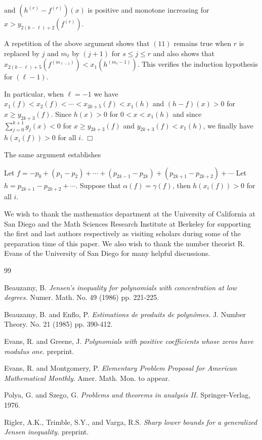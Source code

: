 and $(h^{(r)} - f^{(r)}) {(x)}$ is positive and monotone increasing
for $x > y_{2(k-\ell)+2} (f^{(r)})$.


A repetition of the above argument shows that $(11)$ remains true
when $r$ is replaced by $j$ and $m_\ell$ by $(j+1)$ for $s \leq j
\leq r$ and also shows that $x_{2(k-\ell)+5} (f^{(m_{\ell-1})}) < x_1
(h^{(m_\ell-1)})$.  This verifies the induction hypothesis for $(\ell
-1)$.

In particular, when $\ell = -1$ we have $x_1 (f) < x_2 (f) < \cdots <
x_{2k+5} (f) < x_1 (h)$ and $(h-f) (x) > 0$ for $x \geq y_{2k+3}
(f)$.  Since $h(x) > 0$ for $0 < x < x_1 (h)$ and since
$\sum^{k+1}_{j=0} g_j (x) <0$ for $x \geq y_{2k+3} (f)$ and $y_{2k+3}
(f) < x_1 (h)$, we finally have $h(x_i (f)) > 0$ for all $i$.
$\Box$\vspace{12pt}

The same argument establishes

\begin{lemma} Let $f = -p_0 + (p_1 - p_2) + \cdots + (p_{2k-1} -
p_{2k}) + (p_{2k+1} - p_{2k+2}) + \cdots$  Let $h = p_{2k+1} -
p_{2k+2} + \cdots$.  Suppose that $\alpha (f) = \gamma (f)$, then
$h(x_i (f)) > 0$ for all $i$.
\end{lemma}

\vspace{12pt}


\vspace{12pt}

  We wish to thank the mathematics department at the University of California at San Diego and the Math Sciences Research Institute at Berkeley for supporting the first and last authors respectively as visiting scholars during some of the preparation time of this paper.  We also wish to thank the number theorist
R. Evans of the University of San Diego for many helpful discussions.
\begin{thebibliography}{99}

 Beauzamy, B. {\em Jensen's inequality for polynomials
with concentration at low degrees.}  Numer. Math. No. 49 (1986) pp.
221-225.

 Beauzamy, B. and Enflo, P.  {\em Estimations de produits
de polyn\^{o}mes.} J. Number Theory. No. 21 (1985) pp. 390-412.

 Evans, R. and Greene, J. {\em Polynomials with positive
coefficients whose zeros have modulus one.} preprint.

 Evans, R. and Montgomery, P.  {\em Elementary Problem
Proposal for American Mathematical Monthly}.  Amer. Math. Mon. to appear.

 Polya, G. and Szego, G. {\em Problems and theorems in
analysis II.} Springer-Verlag, 1976.

 Rigler, A.K., Trimble, S.Y., and Varga, R.S. {\em Sharp
lower bounds for a generalized Jensen inequality.}  preprint.


\end{thebibliography}





